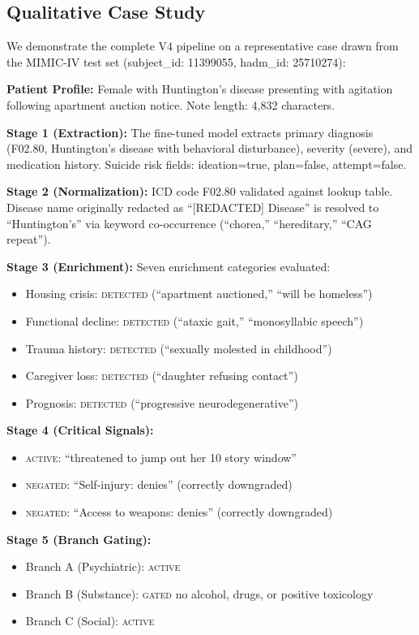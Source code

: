 \documentclass[conference]{IEEEtran}
\begin{document}
\subsection{Qualitative Case Study}

We demonstrate the complete V4 pipeline on a representative case drawn from the MIMIC-IV test set (subject\_id: 11399055, hadm\_id: 25710274):

\textbf{Patient Profile:} Female with Huntington's disease presenting with agitation following apartment auction notice. Note length: 4,832 characters.

\textbf{Stage 1 (Extraction):} The fine-tuned model extracts primary diagnosis (F02.80, Huntington's disease with behavioral disturbance), severity (severe), and medication history. Suicide risk fields: ideation=true, plan=false, attempt=false.

\textbf{Stage 2 (Normalization):} ICD code F02.80 validated against lookup table. Disease name originally redacted as ``[REDACTED] Disease'' is resolved to ``Huntington's'' via keyword co-occurrence (``chorea,'' ``hereditary,'' ``CAG repeat'').

\textbf{Stage 3 (Enrichment):} Seven enrichment categories evaluated:
\begin{itemize}
    \item Housing crisis: \textsc{detected} (``apartment auctioned,'' ``will be homeless'')
    \item Functional decline: \textsc{detected} (``ataxic gait,'' ``monosyllabic speech'')
    \item Trauma history: \textsc{detected} (``sexually molested in childhood'')
    \item Caregiver loss: \textsc{detected} (``daughter refusing contact'')
    \item Prognosis: \textsc{detected} (``progressive neurodegenerative'')
\end{itemize}

\textbf{Stage 4 (Critical Signals):}
\begin{itemize}
    \item \textsc{active}: ``threatened to jump out her 10 story window''
    \item \textsc{negated}: ``Self-injury: denies'' (correctly downgraded)
    \item \textsc{negated}: ``Access to weapons: denies'' (correctly downgraded)
\end{itemize}

\textbf{Stage 5 (Branch Gating):}
\begin{itemize}
    \item Branch A (Psychiatric): \textsc{active}
    \item Branch B (Substance): \textsc{gated}   no alcohol, drugs, or positive toxicology
    \item Branch C (Social): \textsc{active}
\end{itemize}
\end{document}
